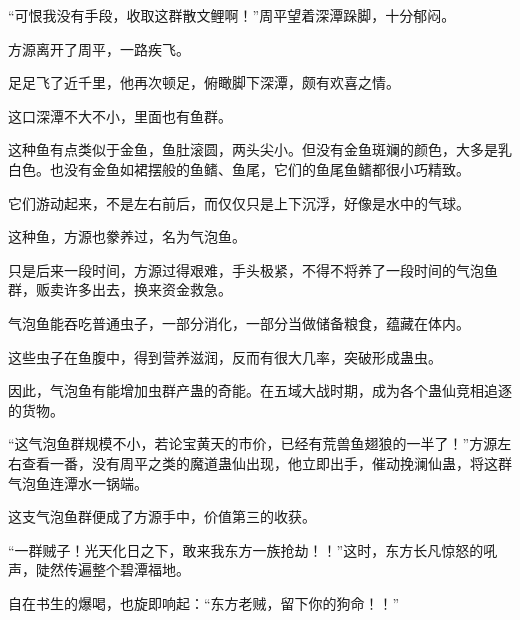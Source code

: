 \begin{this_body}
“可恨我没有手段，收取这群散文鲤啊！”周平望着深潭跺脚，十分郁闷。

方源离开了周平，一路疾飞。

足足飞了近千里，他再次顿足，俯瞰脚下深潭，颇有欢喜之情。

这口深潭不大不小，里面也有鱼群。

这种鱼有点类似于金鱼，鱼肚滚圆，两头尖小。但没有金鱼斑斓的颜色，大多是乳白色。也没有金鱼如裙摆般的鱼鳍、鱼尾，它们的鱼尾鱼鳍都很小巧精致。

它们游动起来，不是左右前后，而仅仅只是上下沉浮，好像是水中的气球。

这种鱼，方源也豢养过，名为气泡鱼。

只是后来一段时间，方源过得艰难，手头极紧，不得不将养了一段时间的气泡鱼群，贩卖许多出去，换来资金救急。

气泡鱼能吞吃普通虫子，一部分消化，一部分当做储备粮食，蕴藏在体内。

这些虫子在鱼腹中，得到营养滋润，反而有很大几率，突破形成蛊虫。

因此，气泡鱼有能增加虫群产蛊的奇能。在五域大战时期，成为各个蛊仙竞相追逐的货物。

“这气泡鱼群规模不小，若论宝黄天的市价，已经有荒兽鱼翅狼的一半了！”方源左右查看一番，没有周平之类的魔道蛊仙出现，他立即出手，催动挽澜仙蛊，将这群气泡鱼连潭水一锅端。

这支气泡鱼群便成了方源手中，价值第三的收获。

“一群贼子！光天化日之下，敢来我东方一族抢劫！！”这时，东方长凡惊怒的吼声，陡然传遍整个碧潭福地。

自在书生的爆喝，也旋即响起：“东方老贼，留下你的狗命！！”

\end{this_body}

